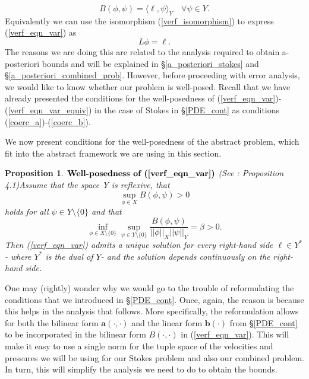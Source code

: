 \documentclass[12pt,a4paper]{article}
\newtheorem{proposition}[theorem]{Proposition}
\theoremstyle{definition}
\begin{document}
\begin{equation}\label{verf_eqn_var}
B\left(\phi,\psi\right)=\langle\ell,\psi\rangle_Y\quad \forall \psi \in Y.
\end{equation}
Equivalently we can use the isomorphism (\ref{verf_isomorphism}) to express (\ref{verf_eqn_var}) as
\begin{equation}\label{verf_eqn_var_equiv}
L\phi=\ell.
\end{equation}
The reasons we are doing this are related to the analysis required to obtain a-posteriori bounds and will be explained in \S \ref{a_posteriori_stokes} and \S \ref{a_posteriori_combined_prob}.  However, before proceeding with error analysis, we would like to know whether our problem is well-posed.   Recall that we have already presented the conditions for the well-posedness of (\ref{verf_eqn_var})-(\ref{verf_eqn_var_equiv}) in the case of Stokes in \S \ref{PDE_cont} as conditions (\ref{coerc_a})-(\ref{coerc_b}).

We now present conditions for the well-posedness of the abstract problem, which   fit into the abstract framework we are using in this section.  
\begin{proposition}{$\textbf{Well-posedness of (\ref{verf_eqn_var})}$} (See \cite[\S4.1.1]{verfurth2013posteriori}:  Proposition 4.1)\label{prop_well_pos_verf}
Assume that the space Y is reflexive, that
\begin{equation}
	\sup_{\phi \in X}B\left(\phi,\psi\right)>0
\end{equation}
holds for all $\psi\in Y\setminus \lbrace 0 \rbrace$ and that
\begin{equation}
	\inf_{\phi\in X\setminus \lbrace0\rbrace}\sup_{\psi \in Y\setminus \lbrace0\rbrace}\frac{B\left(\phi,\psi\right)}{\left|\left|\phi\right|\right|_X\left|\left|\psi\right|\right|_Y}=\beta > 0.
\end{equation}
Then (\ref{verf_eqn_var}) admits a unique solution for every right-hand side $\ell\in Y^*$ - where $Y^*$ is the dual of $Y$- and the solution depends continuously on the right-hand side.
\end{proposition}
One may (rightly) wonder why we would go to the trouble of reformulating the conditions that we introduced in \S \ref{PDE_cont}.  Once, again, the reason is because this helps in the analysis that follows.  More specifically, the reformulation allows for both the bilinear form $\textbf{a}\left(\cdot,\cdot\right)$ and the linear form $\textbf{b}\left(\cdot\right)$ from \S \ref{PDE_cont} to be incorporated in the bilinear form $B\left(\cdot,\cdot\right)$ in (\ref{verf_eqn_var}).  This will make it easy to use a single norm for the tuple space of the velocities and pressures we will be using for our Stokes problem and also our combined problem.  In turn, this will simplify the analysis we need to do to obtain the bounds.
\end{document}
